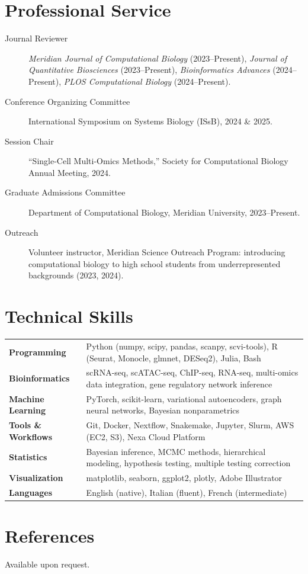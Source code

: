 \documentclass[11pt,a4paper]{article}
\begin{document}
\section{Professional Service}

\begin{description}
  \item[Journal Reviewer] \textit{Meridian Journal of Computational Biology} (2023--Present), \textit{Journal of Quantitative Biosciences} (2023--Present), \textit{Bioinformatics Advances} (2024--Present), \textit{PLOS Computational Biology} (2024--Present).

  \item[Conference Organizing Committee] International Symposium on Systems Biology (IS\lowercase{s}B), 2024 \& 2025.

  \item[Session Chair] ``Single-Cell Multi-Omics Methods,'' Society for Computational Biology Annual Meeting, 2024.

  \item[Graduate Admissions Committee] Department of Computational Biology, Meridian University, 2023--Present.

  \item[Outreach] Volunteer instructor, Meridian Science Outreach Program: introducing computational biology to high school students from underrepresented backgrounds (2023, 2024).
\end{description}

\section{Technical Skills}

{\small
\begin{tabularx}{\textwidth}{L{0.22\textwidth} L{0.78\textwidth}}
\textbf{Programming}       & Python (numpy, scipy, pandas, scanpy, scvi-tools), R (Seurat, Monocle, glmnet, DESeq2), Julia, Bash \\
\textbf{Bioinformatics}    & scRNA-seq, scATAC-seq, ChIP-seq, RNA-seq, multi-omics data integration, gene regulatory network inference \\
\textbf{Machine Learning}  & PyTorch, scikit-learn, variational autoencoders, graph neural networks, Bayesian nonparametrics \\
\textbf{Tools \& Workflows}& Git, Docker, Nextflow, Snakemake, Jupyter, Slurm, AWS (EC2, S3), Nexa Cloud Platform \\
\textbf{Statistics}        & Bayesian inference, MCMC methods, hierarchical modeling, hypothesis testing, multiple testing correction \\
\textbf{Visualization}     & matplotlib, seaborn, ggplot2, plotly, Adobe Illustrator \\
\textbf{Languages}         & English (native), Italian (fluent), French (intermediate)\\
\end{tabularx}
}

\section{References}

Available upon request.

\vfill
\end{document}
